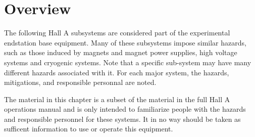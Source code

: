 

\section{Overview}

        The following Hall A subsystems are considered part of the experimental endstation base equipment. 
Many of these subsystems impose similar hazards, such as those induced by magnets and magnet power supplies, 
high voltage systems and cryogenic systems.  Note that a specific sub-system may have many different hazards associated with it.
For each major system, the hazards, mitigations, and responsible personnal are noted.

The material in this chapter is a subset of the material in the full Hall A operations manual and is only intended to familiarize
people with the hazards and responsible personnel for these systems.  It in no way should be taken as sufficent information to
use or operate this equipment.

\graphicspath{{introduction/figs/}}
\renewcommand{\dirfig}[0]{introduction/figs}
\renewcommand{\dircur}[0]{introduction}



\infolevone{}
%


